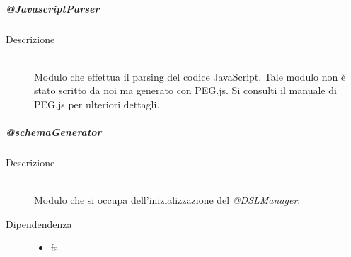 \subparagraph{@JavascriptParser}
\begin{description}
 \item[Descrizione] \hfill \\
  Modulo che effettua il parsing del codice JavaScript. Tale modulo non è stato scritto da noi ma generato con PEG.js. Si consulti il manuale di PEG.js per ulteriori dettagli.
  
 
\end{description}
\subparagraph{@schemaGenerator}
\begin{description}
 \item[Descrizione] \hfill \\
  Modulo che si occupa dell'inizializzazione del \textit{@DSLManager}.
 \item[Dipendendenza] \hfill
 \begin{itemize}
  \item{fs}.
 \end{itemize}
  

\end{description}

